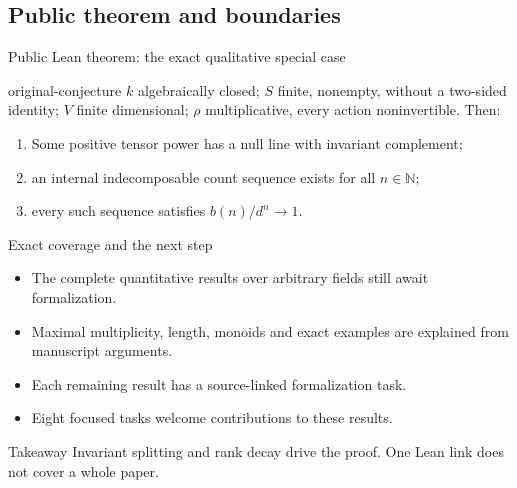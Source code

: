 \documentclass{beamer}
\begin{document}
\subsection{Public theorem and boundaries}
\begin{frame}{Public Lean theorem: the exact qualitative special case}
\begin{bookresult}{original-conjecture}
\small
$k$ algebraically closed; $S$ finite, nonempty, without a two-sided identity; $V$ finite dimensional; $\rho$ multiplicative, every action noninvertible. Then:
\begin{enumerate}
\item Some positive tensor power has a null line with invariant complement;
\item an internal indecomposable count sequence exists for all $n\in\mathbb N$;
\item every such sequence satisfies $b(n)/d^n\to1$.
\end{enumerate}
\end{bookresult}
\end{frame}
\begin{frame}{Exact coverage and the next step}
\begin{itemize}
\item The complete quantitative results over arbitrary fields still await formalization.
\item Maximal multiplicity, length, monoids and exact examples are explained from manuscript arguments.
\item Each remaining result has a source-linked formalization task.
\item Eight focused tasks welcome contributions to these results.
\end{itemize}
\begin{alertblock}{Takeaway}
Invariant splitting and rank decay drive the proof. One Lean link does not cover a whole paper.
\end{alertblock}
\end{frame}
\appendix
\end{document}

